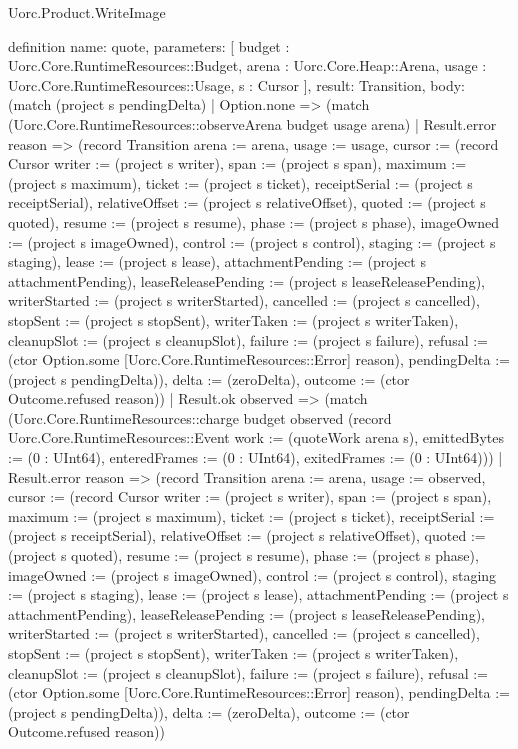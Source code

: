\begin{lexlean}{Uorc.Product.WriteImage}
\begin{semanticmodule}
definition{
  name: quote,
  parameters: [
    budget : Uorc.Core.RuntimeResources::Budget,
    arena : Uorc.Core.Heap::Arena,
    usage : Uorc.Core.RuntimeResources::Usage,
    s : Cursor
  ],
  result: Transition,
  body: (match (project s pendingDelta)
    | Option.none => (match (Uorc.Core.RuntimeResources::observeArena budget usage arena)
      | Result.error reason => (record Transition {arena := arena, usage := usage, cursor := (record Cursor {writer := (project s writer), span := (project s span), maximum := (project s maximum), ticket := (project s ticket), receiptSerial := (project s receiptSerial), relativeOffset := (project s relativeOffset), quoted := (project s quoted), resume := (project s resume), phase := (project s phase), imageOwned := (project s imageOwned), control := (project s control), staging := (project s staging), lease := (project s lease), attachmentPending := (project s attachmentPending), leaseReleasePending := (project s leaseReleasePending), writerStarted := (project s writerStarted), cancelled := (project s cancelled), stopSent := (project s stopSent), writerTaken := (project s writerTaken), cleanupSlot := (project s cleanupSlot), failure := (project s failure), refusal := (ctor Option.some [Uorc.Core.RuntimeResources::Error] reason), pendingDelta := (project s pendingDelta)}), delta := (zeroDelta), outcome := (ctor Outcome.refused reason)})
      | Result.ok observed => (match (Uorc.Core.RuntimeResources::charge budget observed (record Uorc.Core.RuntimeResources::Event {work := (quoteWork arena s), emittedBytes := (0 : UInt64), enteredFrames := (0 : UInt64), exitedFrames := (0 : UInt64)}))
        | Result.error reason => (record Transition {arena := arena, usage := observed, cursor := (record Cursor {writer := (project s writer), span := (project s span), maximum := (project s maximum), ticket := (project s ticket), receiptSerial := (project s receiptSerial), relativeOffset := (project s relativeOffset), quoted := (project s quoted), resume := (project s resume), phase := (project s phase), imageOwned := (project s imageOwned), control := (project s control), staging := (project s staging), lease := (project s lease), attachmentPending := (project s attachmentPending), leaseReleasePending := (project s leaseReleasePending), writerStarted := (project s writerStarted), cancelled := (project s cancelled), stopSent := (project s stopSent), writerTaken := (project s writerTaken), cleanupSlot := (project s cleanupSlot), failure := (project s failure), refusal := (ctor Option.some [Uorc.Core.RuntimeResources::Error] reason), pendingDelta := (project s pendingDelta)}), delta := (zeroDelta), outcome := (ctor Outcome.refused reason)})
}
\end{semanticmodule}
\end{lexlean}
